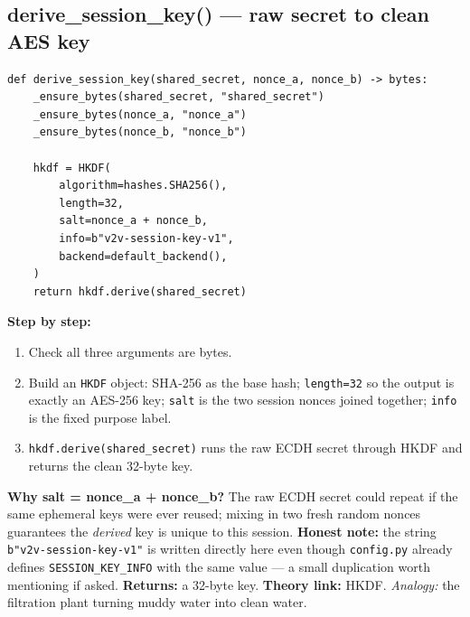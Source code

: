 \documentclass[11pt,a4paper]{article}
\begin{document}
\subsection{derive\_session\_key() --- raw secret to clean AES key}
\begin{lstlisting}[style=py,caption={crypto.py --- HKDF key derivation.}]
def derive_session_key(shared_secret, nonce_a, nonce_b) -> bytes:
    _ensure_bytes(shared_secret, "shared_secret")
    _ensure_bytes(nonce_a, "nonce_a")
    _ensure_bytes(nonce_b, "nonce_b")

    hkdf = HKDF(
        algorithm=hashes.SHA256(),
        length=32,
        salt=nonce_a + nonce_b,
        info=b"v2v-session-key-v1",
        backend=default_backend(),
    )
    return hkdf.derive(shared_secret)
\end{lstlisting}
\textbf{Step by step:}
\begin{enumerate}
  \item Check all three arguments are bytes.
  \item Build an \texttt{HKDF} object: SHA-256 as the base hash;
        \texttt{length=32} so the output is exactly an AES-256 key;
        \texttt{salt} is the two session nonces joined together;
        \texttt{info} is the fixed purpose label.
  \item \texttt{hkdf.derive(shared\_secret)} runs the raw ECDH secret through
        HKDF and returns the clean 32-byte key.
\end{enumerate}
\textbf{Why salt = nonce\_a + nonce\_b?} The raw ECDH secret could repeat if the
same ephemeral keys were ever reused; mixing in two fresh random nonces
guarantees the \emph{derived} key is unique to this session.
\textbf{Honest note:} the string \texttt{b"v2v-session-key-v1"} is written
directly here even though \texttt{config.py} already defines
\texttt{SESSION\_KEY\_INFO} with the same value --- a small duplication worth
mentioning if asked. \textbf{Returns:} a 32-byte key. \textbf{Theory link:} HKDF.
\emph{Analogy:} the filtration plant turning muddy water into clean water.
\end{document}

